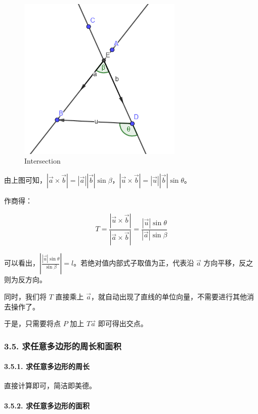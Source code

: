 \begin{figure}[htbp]
\centering
\includegraphics[width=0.7\textwidth]{docs/geometry/images/2d-intersection.png} 
\caption{Intersection}
\end{figure}

由上图可知，$|\vec a\times \vec b|=|\vec a||\vec b|\sin \beta$，$|\vec u\times \vec b|=|\vec u||\vec b|\sin \theta$。

作商得：

$$
T=\frac{|\vec u\times \vec b|}{|\vec a\times \vec b|}=\frac{|\vec u|\sin \theta}{|\vec a|\sin \beta}
$$

可以看出，$|\frac{|\vec u|\sin \theta}{\sin \beta}|=l​$。若绝对值内部式子取值为正，代表沿 $\vec a​$ 方向平移，反之则为反方向。

同时，我们将 $T$ 直接乘上 $\vec a$，就自动出现了直线的单位向量，不需要进行其他消去操作了。

于是，只需要将点 $P$ 加上 $T\vec a$ 即可得出交点。

\subsubsection{3.5. 求任意多边形的周长和面积}

\paragraph{3.5.1. 求任意多边形的周长}

直接计算即可，简洁即美德。

\paragraph{3.5.2. 求任意多边形的面积}

